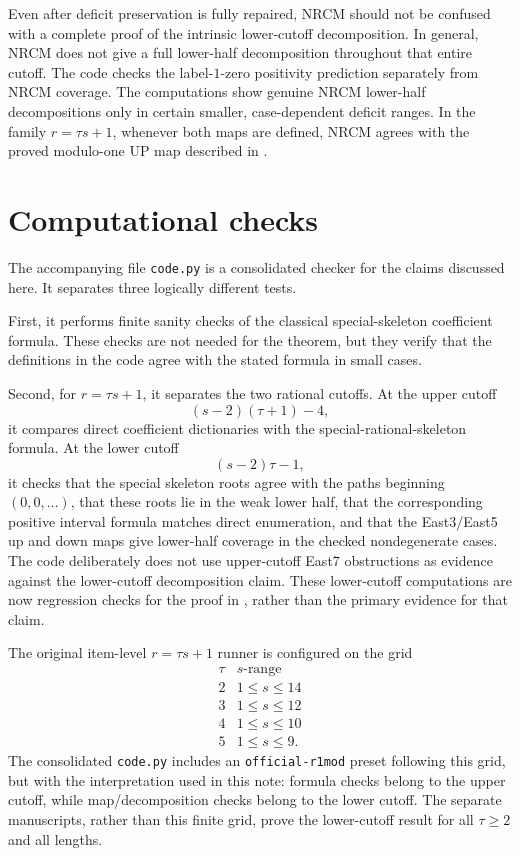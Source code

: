 \documentclass[11pt]{article}
\begin{document}
Even after deficit preservation is fully repaired, NRCM should not be
confused with a complete proof of the intrinsic lower-cutoff decomposition.
In general, NRCM does not give a full lower-half decomposition throughout that
entire cutoff.  The code checks the label-\(1\)-zero positivity prediction
separately from NRCM coverage.  The computations show genuine NRCM
lower-half decompositions only in certain smaller, case-dependent deficit
ranges.  In the family \(r=\tau s+1\), whenever both maps are defined, NRCM
agrees with the proved modulo-one UP map described in
.

\section{Computational checks}

The accompanying file \texttt{code.py} is a consolidated checker for the claims
discussed here.  It separates three logically different tests.

First, it performs finite sanity checks of the classical special-skeleton
coefficient formula.  These checks are not needed for the theorem, but they
verify that the definitions in the code agree with the stated formula in small
cases.

Second, for \(r=\tau s+1\), it separates the two rational cutoffs.  At the
upper cutoff
\[
  (s-2)(\tau+1)-4,
\]
it compares direct coefficient dictionaries with the special-rational-skeleton
formula.  At the lower cutoff
\[
  (s-2)\tau-1,
\]
it checks that the special skeleton roots agree with the paths beginning
\((0,0,\ldots)\), that these roots lie in the weak lower half, that the
corresponding positive interval formula matches direct enumeration, and that
the East3/East5 up and down maps give lower-half coverage in the checked
nondegenerate cases.  The code deliberately does not use upper-cutoff East7
obstructions as evidence against the lower-cutoff decomposition claim.
These lower-cutoff computations are now regression checks for the proof in
, rather than the primary evidence for that claim.

The original item-level \(r=\tau s+1\) runner is configured on the grid
\[
\begin{array}{c|c}
\tau & s\text{-range}\\
\hline
2 & 1\le s\le14\\
3 & 1\le s\le12\\
4 & 1\le s\le10\\
5 & 1\le s\le9.
\end{array}
\]
The consolidated \texttt{code.py} includes an \texttt{official-r1mod} preset
following this grid, but with the interpretation used in this note: formula
checks belong to the upper cutoff, while map/decomposition checks belong to the
lower cutoff.  The separate manuscripts, rather than this finite grid, prove
the lower-cutoff result for all \(\tau\ge2\) and all lengths.
\end{document}

